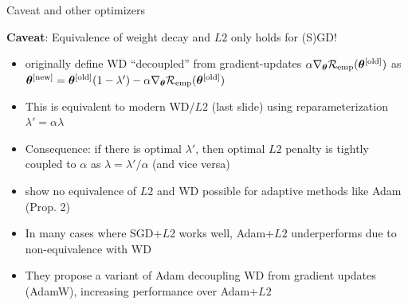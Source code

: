 \documentclass[11pt,compress,t,notes=noshow, xcolor=table]{beamer}
\begin{document}
\begin{vbframe}{Caveat and other optimizers}

\textbf{Caveat}: Equivalence of weight decay and $L2$ only holds for (S)GD!

\begin{itemize}\setlength{\itemsep}{0.5em}
    \item {} originally define WD ``decoupled'' from gradient-updates {\footnotesize $\alpha \nabla_{\bm{\theta}} \mathcal{R}_{\text{emp}}(\bm{\theta}^{[\text{old}]})$} as
    {\footnotesize $\bm{\theta}^{[\text{new}]} =
    \bm{\theta}^{[\text{old}]} (1 - \lambda') - \alpha \nabla_{\bm{\theta}} \mathcal{R}_{\text{emp}}(\bm{\theta}^{[\text{old}]})$}
    \item This is equivalent to modern WD/$L2$ (last slide) using reparameterization $\lambda'=\alpha \lambda$
    \item Consequence: if there is optimal $\lambda'$, then optimal $L2$ penalty is tightly coupled to $\alpha$ as $\lambda=\lambda'/ \alpha$ (and vice versa)
    
    \item {} show no equivalence of $L2$ and WD possible for adaptive methods like Adam (Prop. 2)
    \item In many cases where SGD+$L2$ works well, Adam+$L2$ underperforms due to non-equivalence with WD
    \item They propose a variant of Adam decoupling WD from gradient updates (AdamW), increasing performance over Adam+$L2$
\end{itemize}




\end{vbframe}


\endlecture
\end{document}
